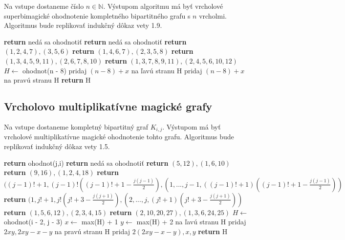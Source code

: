 \begin{subalg}  Na vstupe dostaneme číslo $n \in \mathbb{N}$. Výstupom algoritmu má byť vrcholové superbimagické ohodnotenie kompletného bipartitného grafu s $n$ vrcholmi. Algoritmus bude replikovať indukčný dôkaz vety 1.9.
\end{subalg}

\begin{algorithmic}
	\STATE \textbf{return} nedá sa ohodnotiť
\ENDIF
{}
	\STATE \textbf{return} nedá sa ohodnotiť
\ENDIF
{}
	\STATE \textbf{return} $(1, 2, 4, 7), (3, 5, 6)$
\ENDIF
{}
	\STATE \textbf{return} $(1, 4, 6, 7), (2, 3, 5, 8)$
\ENDIF
{}
	\STATE \textbf{return} $(1, 3, 4, 5, 9, 11), (2, 6, 7, 8, 10)$
\ENDIF
{}
	\STATE \textbf{return} $(1, 3, 7, 8, 9, 11), (2, 4, 5, 6, 10, 12)$
\ENDIF
\STATE $H \gets$ ohodnot(n - 8)
		\STATE pridaj $(n-8)+x$ na ľavú stranu H
	\ELSE
		\STATE pridaj $(n-8)+x$ na pravú stranu H
	\ENDIF
\ENDFOR
\STATE \textbf{return} H
\end{algorithmic}

\subsection{Vrcholovo multiplikatívne magické grafy}

\begin{subalg} Na vstupe dostaneme kompletný bipartitný graf $K_{i,j}$. Výstupom má byť vrcholové multiplikatívne magické ohodnotenie tohto grafu. Algoritmus bude replikovať indukčný dôkaz vety 1.5.
\end{subalg}

\begin{algorithmic}
	\STATE \textbf{return} ohodnot(j,i)
\ENDIF
{}
	\STATE \textbf{return} nedá sa ohodnotiť
\ENDIF
{}
	\STATE \textbf{return} $(5, 12), (1, 6, 10)$
\ENDIF
{}
	\STATE \textbf{return} $(9, 16), (1, 2, 4, 18)$
\ENDIF
{}
	\STATE \textbf{return} $((j-1)! + 1, (j-1)! ((j-1)! + 1 - \frac{j(j-1)}{2}), (1, ... , j-1, ((j-1)! + 1) ((j-1)! + 1 - \frac{j(j-1)}{2}))$
\ENDIF
{}
	\STATE \textbf{return} $(1, j! + 1, j! (j! + 3 - \frac{j(j+1)}{2}), (2, ... , j, (j! + 1) (j! + 3 - \frac{j(j+1)}{2}))$
\ENDIF
{}
	\STATE \textbf{return} $(1, 5, 6, 12), (2, 3, 4, 15)$
\ENDIF
{}
	\STATE \textbf{return} $(2, 10, 20, 27), (1, 3, 6, 24, 25)$
\ENDIF
\STATE $H \gets$ ohodnot(i - 2, j - 3)
\STATE $x \gets$ max(H) + 1
\STATE $y \gets$ max(H) + 2
\STATE na ľavú stranu H pridaj $2xy, 2xy - x - y$
\STATE na pravú stranu H pridaj $2(2xy - x - y), x, y$
\STATE \textbf{return} H
\end{algorithmic}

